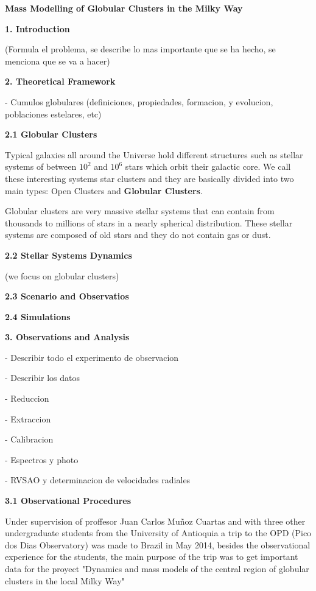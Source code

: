 \documentclass[english]{article}
\begin{document}
\parskip=3mm
\parindent=0mm


\begin{center}
\textbf{{\huge Mass Modelling of Globular Clusters in the Milky Way}}
\end{center}

\textbf{{\LARGE 1. Introduction}}

(Formula el problema, se describe lo mas importante que se ha hecho, se menciona que se va a hacer)

\textbf{{\LARGE 2. Theoretical Framework}}


- Cumulos globulares (definiciones, propiedades, formacion, y evolucion, poblaciones estelares, etc)

\textbf{{\Large 2.1 Globular Clusters}}

Typical galaxies all around the Universe hold different structures such as stellar systems of between $ 10^{2} $ and $ 10^{6} $ stars which orbit their galactic core. We call these interesting systems star clusters and they are basically divided into two main types: Open Clusters and \textbf{Globular Clusters}.

Globular clusters are very massive stellar systems that can contain from thousands to millions of stars in a nearly spherical distribution. These stellar systems are composed of old stars and they do not contain gas or dust. 

\textbf{{\Large 2.2 Stellar Systems Dynamics}}

(we focus on globular clusters)

\textbf{{\Large 2.3 Scenario and Observatios}}

\textbf{{\Large 2.4 Simulations}}

\textbf{{\LARGE 3. Observations and Analysis}}

- Describir todo el experimento de observacion

- Describir los datos

- Reduccion

- Extraccion

- Calibracion

- Espectros y photo

- RVSAO y determinacion de velocidades radiales

\textbf{{\Large 3.1 Observational Procedures}}

Under supervision of proffesor Juan Carlos Mu\~noz Cuartas and with three other undergraduate students from the University of Antioquia a trip to the OPD (Pico dos Dias Observatory) was made to Brazil in May 2014, besides the observational experience for the students, the main purpose of the trip was to get important data for the proyect "Dynamics and mass models of the central region of globular clusters in the local Milky Way"
\end{document}
